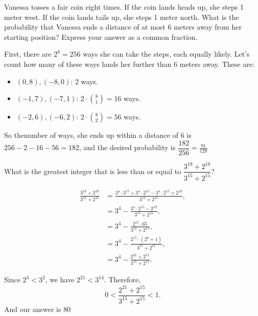 \documentclass[11pt,twoside]{scrartcl}
\begin{document}
\begin{problem}
    Vanessa tosses a fair coin eight times. If the coin lands heads up, she steps 1 meter west. If the coin lands tails up, she steps 1 meter north. What is the probability that Vanessa ends a distance of at most 6 meters away from her starting position? Express your answer as a common fraction.
    \begin{sketch}
        First, there are $2^8 = 256$ ways she can take the steps, each equally likely. Let's count how many of these ways lands her further than 6 meters away. These are:
        \begin{itemize}
            \item $(0,8),(-8,0)$: $2$ ways.
            \item $(-1,7),(-7,1)$: $2\cdot\binom{8}{1} = 16$ ways.
            \item $(-2,6),(-6,2)$: $2\cdot\binom{8}{2} = 56$ ways.
        \end{itemize}
        So thenumber of ways, she ends up within a distance of 6 is $256 - 2 - 16 - 56 = 182$, and the desired probability is $\dfrac{182}{256} = \boxed{\frac{91}{128}}$


    \end{sketch}
\end{problem}

\begin{problem}
    What is the greatest integer that is less than or equal to $ \dfrac{3^{19} + 2^{19}}{3^{15} + 2^{15}} $?
    \begin{sketch}
        \begin{align*}
            \frac{3^{19} + 2^{19}}{3^{15} + 2^{15}} &= \frac{3^4\cdot3^{15}+3^4\cdot2^{15}-3^4\cdot2^{15}+2^{19}}{3^{15} + 2^{15}}, \\
            &= 3^4 - \frac{3^4\cdot2^{15}-2^{19}}{3^{15} + 2^{15}}, \\
            &= 3^4 - \frac{2^{15}\cdot65}{3^{15} + 2^{15}}, \\
            &= 3^4 - \frac{2^{15}\cdot(2^6+1)}{3^{15} + 2^{15}}, \\
            &= 3^4 - \frac{2^{21} + 2^{15}}{3^{15} + 2^{15}}.
        \end{align*}

        Since $2^3 < 3^2$, we have $2^{21} < 3^{14}$. Therefore,
        \[ 0 < \frac{2^{21} + 2^{15}}{3^{15} + 2^{15}} < 1. \]
        And our answer is $\boxed{80}$
    \end{sketch}
\end{problem}
\end{document}
